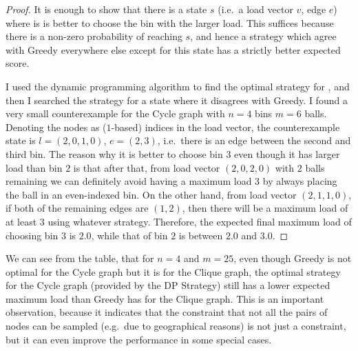 \begin{proof}
It is enough to show that there is a state $s$ (i.e.\ a load vector $v$, edge $e$) where is is better to choose the bin with the larger load. This suffices because there is a non-zero probability of reaching $s$, and hence a strategy which agree with Greedy everywhere else except for this state has a strictly better expected score.


I used the dynamic programming algorithm to find the optimal strategy for \GraphicalTwoChoice, and then I searched the strategy for a state where it disagrees with Greedy. I found a very small counterexample for the Cycle graph with $n=4$ bins $m=6$ balls. Denoting the nodes as ($1$-based) indices in the load vector, the counterexample state is $l=(2,0,1,0)$,  $e=(2,3)$, i.e.\ there is an edge between the second and third bin. The reason why it is better to choose bin $3$ even though it has larger load than bin $2$ is that after that, from load vector $(2,0,2,0)$ with $2$ balls remaining we can definitely avoid having a maximum load $3$ by always placing the ball in an even-indexed bin. On the other hand, from load vector $(2,1,1,0)$, if both of the remaining edges are $(1,2)$, then there will be a maximum load of at least $3$ using whatever strategy. Therefore, the expected final maximum load of choosing bin $3$ is $2.0$, while that of bin $2$ is between $2.0$ and $3.0$.
\end{proof}



We can see from the table, that for $n=4$ and $m=25$, even though Greedy is not optimal for the Cycle graph but it is for the Clique graph, the optimal strategy for the Cycle graph (provided by the DP Strategy) still has a lower expected maximum load than Greedy has for the Clique graph. This is an important observation, because it indicates that the constraint that not all the pairs of nodes can be sampled (e.g.\ due to geographical reasons) is not just a constraint, but it can even improve the performance in some special cases.


